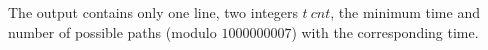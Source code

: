 The output contains only one line, two integers $t\ cnt$, the minimum time and number of possible paths (modulo $1000000007$) with the corresponding time.
